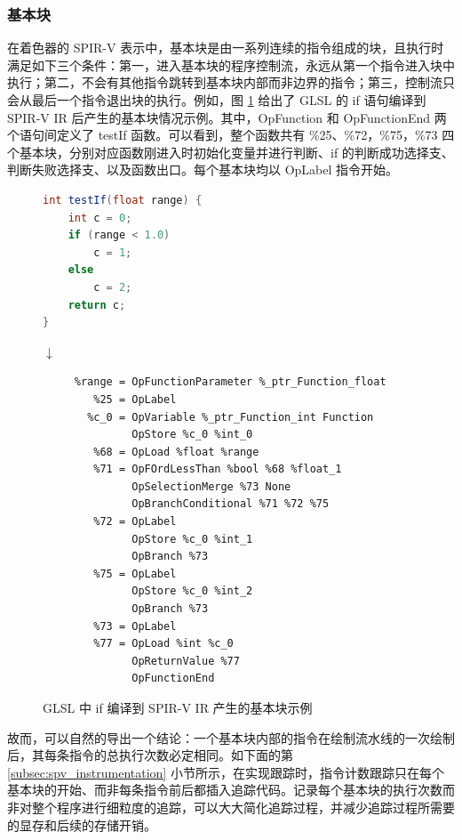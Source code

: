 \subsubsection{基本块}
\label{sec:spv_bb}

在着色器的 SPIR-V 表示中，基本块是由一系列连续的指令组成的块，且执行时满足如下三个条件：{\amend 第一，}进入基本块的程序控制流，永远从第一个指令进入块中执行；{\amend 第二，}不会有其他指令跳转到基本块内部而非边界的指令；{\amend 第三，}控制流只会从最后一个指令退出块的执行。例如，图 \ref{fig:if_spv_ir} 给出了 GLSL 的 if 语句编译到 SPIR-V IR 后产生的基本块情况示例。其中，OpFunction 和 OpFunctionEnd 两个语句间定义了 testIf 函数。可以看到，整个函数共有 \%25、\%72，\%75，\%73 四个基本块，分别对应函数刚进入时初始化变量并进行判断、if 的判断成功选择支、判断失败选择支、以及函数出口。每个基本块均以 OpLabel 指令开始。

\begin{figure}
\centering
\begin{lstlisting}[language=GLSL]
int testIf(float range) {
    int c = 0;
    if (range < 1.0)
        c = 1;
    else
        c = 2;
    return c;
}
\end{lstlisting}
$ \downarrow $
\begin{lstlisting}[language=spirvir]
%testIf_f1_ = OpFunction %int None %22
     %range = OpFunctionParameter %_ptr_Function_float
        %25 = OpLabel
       %c_0 = OpVariable %_ptr_Function_int Function
              OpStore %c_0 %int_0
        %68 = OpLoad %float %range                       
        %71 = OpFOrdLessThan %bool %68 %float_1
              OpSelectionMerge %73 None                  
              OpBranchConditional %71 %72 %75
        %72 = OpLabel
              OpStore %c_0 %int_1
              OpBranch %73
        %75 = OpLabel
              OpStore %c_0 %int_2
              OpBranch %73
        %73 = OpLabel
        %77 = OpLoad %int %c_0
              OpReturnValue %77
              OpFunctionEnd
\end{lstlisting}
\caption{GLSL 中 if 编译到 SPIR-V IR 产生的基本块示例}
\label{fig:if_spv_ir}
\end{figure}

{\amend 故而，}可以自然的导出一个结论：一个基本块内部的指令在绘制流水线的一次绘制后，其每条指令的总执行次数必定相同。如{\amend 下面的}第 \ref{subsec:spv_instrumentation} 小节所示，在实现跟踪时，指令计数跟踪只在每个基本块的开始、而非每条指令前后都插入追踪代码。记录每个基本块的执行次数而非对整个程序进行细粒度的追踪，可以大大简化追踪过程，并减少追踪过程所需要的显存和后续的存储开销。

